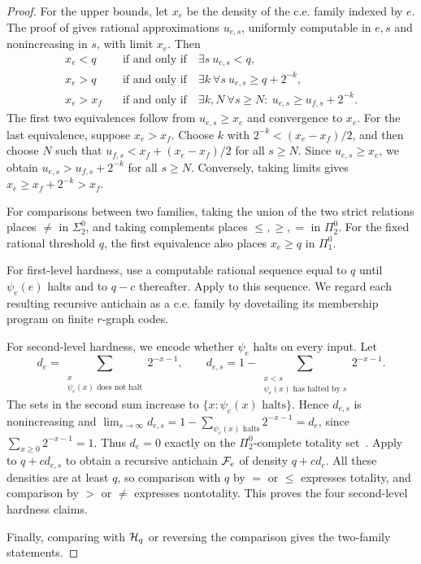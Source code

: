 \documentclass[10pt]{article}
\numberwithin{equation}{section}
\theoremstyle{definition}
\begin{document}
\begin{proof}
For the upper bounds, let $x_e$ be the density of the c.e. family indexed by $e$. The proof of  gives rational approximations $u_{e,s}$, uniformly computable in $e,s$ and nonincreasing in $s$, with limit $x_e$. Then
\[
\begin{aligned}
 x_e<q&\quad\text{if and only if}\quad\exists s\ u_{e,s}<q,\\
 x_e>q&\quad\text{if and only if}\quad\exists k\ \forall s\ u_{e,s}\ge q+2^{-k},\\
 x_e>x_f&\quad\text{if and only if}\quad\exists k,N\ \forall s\ge N\colon\ u_{e,s}\ge u_{f,s}+2^{-k}.
\end{aligned}
\]
The first two equivalences follow from $u_{e,s}\ge x_e$ and convergence to $x_e$. For the last equivalence, suppose $x_e>x_f$. Choose $k$ with $2^{-k}<(x_e-x_f)/2$, and then choose $N$ such that $u_{f,s}<x_f+(x_e-x_f)/2$ for all $s\ge N$. Since $u_{e,s}\ge x_e$, we obtain $u_{e,s}>u_{f,s}+2^{-k}$ for all $s\ge N$. Conversely, taking limits gives $x_e\ge x_f+2^{-k}>x_f$.

For comparisons between two families, taking the union of the two strict relations places $\ne$ in $\Sigma^0_2$, and taking complements places $\le,\ge,=$ in $\Pi^0_2$. For the fixed rational threshold $q$, the first equivalence also places $x_e\ge q$ in $\Pi^0_1$.

For first-level hardness, use a computable rational sequence equal to $q$ until $\psi_e(e)$ halts and to $q-c$ thereafter. Apply  to this sequence. We regard each resulting recursive antichain as a c.e. family by dovetailing its membership program on finite $r$-graph codes.

For second-level hardness, we encode whether $\psi_e$ halts on every input. Let
\[
 d_e=\sum_{\substack{x\\\psi_e(x)\text{ does not halt}}}2^{-x-1},\qquad
 d_{e,s}=1-\sum_{\substack{x<s\\\psi_e(x)\text{ has halted by }s}}
                 2^{-x-1}.
\]
The sets in the second sum increase to $\{x\colon\psi_e(x)\text{ halts}\}$. Hence $d_{e,s}$ is nonincreasing and $\lim_{s\to\infty}d_{e,s}=1-\sum_{\psi_e(x)\text{ halts}}2^{-x-1}=d_e$, since $\sum_{x\ge0}2^{-x-1}=1$. Thus $d_e=0$ exactly on the $\Pi^0_2$-complete totality set~\cite{Rogers1967}. Apply  to $q+cd_{e,s}$ to obtain a recursive antichain $\mathcal F_e$ of density $q+cd_e$. All these densities are at least $q$, so comparison with $q$ by $=$ or $\le$ expresses totality, and comparison by $>$ or $\ne$ expresses nontotality. This proves the four second-level hardness claims.

Finally, comparing with $\mathcal H_q$ or reversing the comparison gives the two-family statements.
\end{proof}
\end{document}
